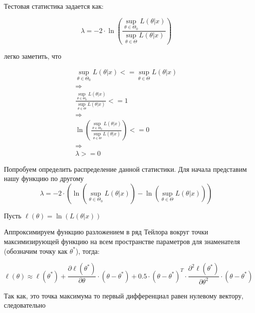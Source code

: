 \documentclass{article}
\begin{document}
    \quad

    Тестовая статистика задается как:

    \quad

    \begin{equation}
        \lambda = - 2 \cdot \ln(  \frac{\sup_{\theta \in \Theta_{0}} L(\theta | x) }{\sup_{\theta \in \Theta} L(\theta | x) } )
    \end{equation}

    легко заметить, что

    \[
    \begin{gathered}
        \sup_{\theta \in \Theta_{0}} L(\theta | x) <= \sup_{\theta \in \Theta} L(\theta | x) \\
        \Rightarrow \\
        \frac{\sup_{\theta \in \Theta_{0}} L(\theta | x) }{\sup_{\theta \in \Theta} L(\theta | x) } <= 1 \\
        \Rightarrow \\
        \ln(  \frac{\sup_{\theta \in \Theta_{0}} L(\theta | x) }{\sup_{\theta \in \Theta} L(\theta | x) } ) <= 0 \\
        \Rightarrow \\
        \lambda >= 0
    \end{gathered}
    \]

    Попробуем определить распределение данной статистики.
    Для начала представим нашу функцию по другому
    \begin{equation}
        \lambda = -2 \cdot (\ln(\sup_{\theta \in \Theta_{0}} L(\theta | x)) - \ln(\sup_{\theta \in \Theta} L(\theta | x)) )
    \end{equation}

    Пусть $\ell(\theta) = \ln(L(\theta | x))$

    Аппроксимируем функцию разложением в ряд Тейлора вокруг точки максимизирующей функцию на всем пространстве параметров для знаменателя (обозначим точку как $\theta^{*}$), тогда:

    \begin{equation}
        \ell(\theta) \approx \ell(\theta^{*}) + \frac{\partial \ell(\theta^{*})}{\partial \theta} \cdot (\theta - \theta^{*}) +
        0.5 \cdot (\theta - \theta^{*})^{T} \cdot \frac{\partial^{2} \ell(\theta^{*})}{\partial \theta^{2}} \cdot (\theta - \theta^{*})
    \end{equation}

    \quad

    Так как, это точка максимума то первый дифференциал равен нулевому вектору, следовательно
\end{document}
